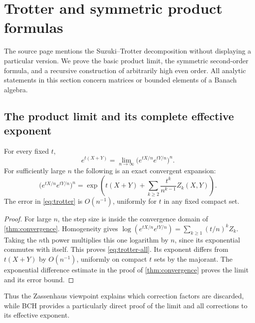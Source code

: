 \section{Trotter and symmetric product formulas}\label{sec:splitting}
The source page mentions the Suzuki--Trotter decomposition without displaying a particular version. We prove the basic product limit, the symmetric second-order formula, and a recursive construction of arbitrarily high even order. All analytic statements in this section concern matrices or bounded elements of a Banach algebra.

\subsection{The product limit and its complete effective exponent}
\begin{theorem}\label{thm:trotter}
For every fixed $t$,
\begin{equation}\label{eq:trotter}
 e^{t(X+Y)}=\lim_{n\to\infty}
 \bigl(e^{tX/n}e^{tY/n}\bigr)^n.
\end{equation}
For sufficiently large $n$ the following is an exact convergent expansion:
\begin{equation}\label{eq:trotter-all}
 \bigl(e^{tX/n}e^{tY/n}\bigr)^n
 =\exp\!\left(t(X+Y)+
       \sum_{k\geq2}\frac{t^k}{n^{k-1}}Z_k(X,Y)\right).
\end{equation}
The error in \cref{eq:trotter} is $O(n^{-1})$, uniformly for $t$ in any fixed compact set.
\end{theorem}
\begin{proof}
For large $n$, the step size is inside the convergence domain of \cref{thm:convergence}. Homogeneity gives
$\log(e^{tX/n}e^{tY/n})=\sum_{k\geq1}(t/n)^kZ_k$.
Taking the $n$th power multiplies this one logarithm by $n$, since its exponential commutes with itself. This proves \cref{eq:trotter-all}. Its exponent differs from $t(X+Y)$ by $O(n^{-1})$, uniformly on compact $t$ sets by the majorant. The exponential difference estimate in the proof of \cref{thm:convergence} proves the limit and its error bound.
\end{proof}
Thus the Zassenhaus viewpoint explains which correction factors are discarded, while BCH provides a particularly direct proof of the limit and all corrections to its effective exponent.

